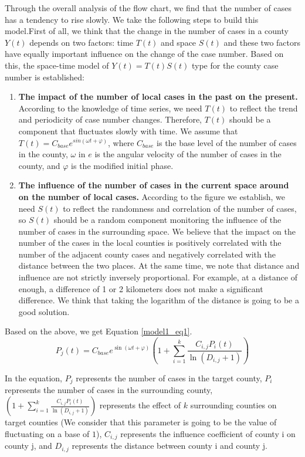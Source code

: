 \documentclass{mcmthesis}
\begin{document}
Through the overall analysis of the flow chart, we find that the number of cases has a tendency to rise slowly. We take the following steps to build this model.First of all, we think that the change in the number of cases in a county $Y(t)$ depends on two factors: time $T(t)$ and space $S(t)$ and these two factors have equally important influence on the change of the case number. Based on this, the space-time model of $Y(t) = T(t)S(t)$ type for the county case number is established:
\begin{enumerate}
	\item \textbf{The impact of the number of local cases in the past on the present.} According to the knowledge of time series, we need $T(t)$ to reflect the trend and periodicity of case number changes. Therefore, $T(t)$ should be a component that fluctuates slowly with time. We assume that $ T(t) = C_{base}e^{sin(\omega t+\varphi)}$, where $C_{base}$ is the base level of the number of cases in the county, $\omega$ in $e$ is the angular velocity of the number of cases in the county, and $\varphi$ is the modified initial phase.
	\item \textbf{The influence of the number of cases in the current space around on the number of local cases.} According to the figure we establish, we need $S(t)$ to reflect the randomness and correlation of the number of cases, so $S(t)$ should be a random component monitoring the influence of the number of cases in the surrounding space. We believe that the impact on the number of the cases in the local counties is positively correlated with the number of the adjacent county cases and negatively correlated with the distance between the two places. At the same time, we note that distance and influence are not strictly inversely proportional. For example, at a distance of enough, a difference of 1 or 2 kilometers does not make a significant difference. We think that taking the logarithm of the distance is going to be a good solution.
\end{enumerate} 

Based on the above, we get Equation \eqref{model1_eq1}.
\begin{equation}
P_{j}(t) = C_{base} e^{\sin (\omega t+\varphi)} (1+\sum_{i=1}^{k} {\frac{C_{i,j} P_{i}(t)}{\ln (D_{i,j}+1)}})
\label{model1_eq1}
\end{equation}

In the equation, $P_{j}$ represents the number of cases in the target county, $P_{i}$ represents the number of cases in the surrounding county, $(1+\sum_{i=1}^{k} {\frac{C_{i,j} P_{i}(t)}{\ln (D_{i,j}+1)}})$ represents the effect of $k$ surrounding counties on target counties (We consider that this parameter is going to be the value of fluctuating on a base of $1$), $C_{i,j}$ represents the influence coefficient of county i on county j, and $D_{i,j}$ represents the distance between county i and county j.
\end{document}
